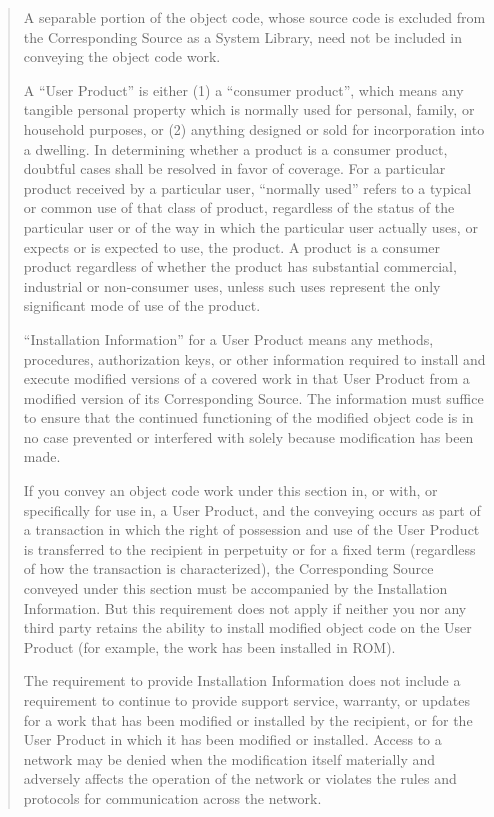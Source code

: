 \documentclass[letterpaper,10pt,english]{sphinxmanual}
\begin{document}
\begin{quote}
A separable portion of the object code, whose source code is excluded
from the Corresponding Source as a System Library, need not be
included in conveying the object code work.

A ``User Product'' is either (1) a ``consumer product'', which means any
tangible personal property which is normally used for personal, family,
or household purposes, or (2) anything designed or sold for incorporation
into a dwelling.  In determining whether a product is a consumer product,
doubtful cases shall be resolved in favor of coverage.  For a particular
product received by a particular user, ``normally used'' refers to a
typical or common use of that class of product, regardless of the status
of the particular user or of the way in which the particular user
actually uses, or expects or is expected to use, the product.  A product
is a consumer product regardless of whether the product has substantial
commercial, industrial or non-consumer uses, unless such uses represent
the only significant mode of use of the product.

``Installation Information'' for a User Product means any methods,
procedures, authorization keys, or other information required to install
and execute modified versions of a covered work in that User Product from
a modified version of its Corresponding Source.  The information must
suffice to ensure that the continued functioning of the modified object
code is in no case prevented or interfered with solely because
modification has been made.

If you convey an object code work under this section in, or with, or
specifically for use in, a User Product, and the conveying occurs as
part of a transaction in which the right of possession and use of the
User Product is transferred to the recipient in perpetuity or for a
fixed term (regardless of how the transaction is characterized), the
Corresponding Source conveyed under this section must be accompanied
by the Installation Information.  But this requirement does not apply
if neither you nor any third party retains the ability to install
modified object code on the User Product (for example, the work has
been installed in ROM).

The requirement to provide Installation Information does not include a
requirement to continue to provide support service, warranty, or updates
for a work that has been modified or installed by the recipient, or for
the User Product in which it has been modified or installed.  Access to a
network may be denied when the modification itself materially and
adversely affects the operation of the network or violates the rules and
protocols for communication across the network.


\end{quote}
\end{document}
